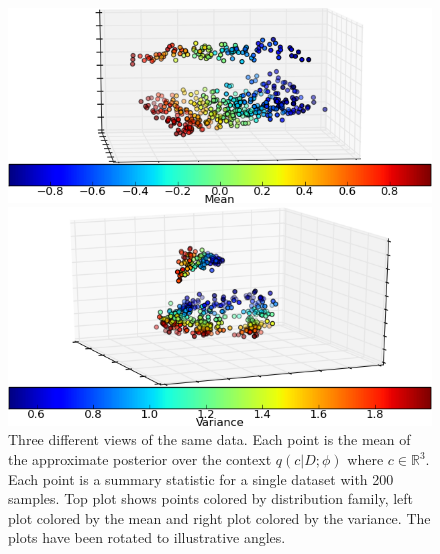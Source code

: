\documentclass{article} %
\begin{document}
\begin{figure}
\begin{minipage}{0.4\textwidth}
\includegraphics[width=1\linewidth]{synthetic_mean.png}
\end{minipage}
\begin{minipage}{0.4\textwidth}
\vspace{-0.9em}
\includegraphics[width=1\linewidth]{synthetic_var.png}
\end{minipage}
\caption{Three different views of the same data. Each point is the mean of the approximate posterior over the context $q(c | D ;\phi)$ where $c \in \mathbb{R}^3$. Each point is a summary statistic for a single dataset with 200 samples. Top plot shows points colored by distribution family, left plot colored by the mean and right plot colored by the variance. The plots have been rotated to illustrative angles. \label{fig:synthetic_data}}
\end{figure}
\end{document}
